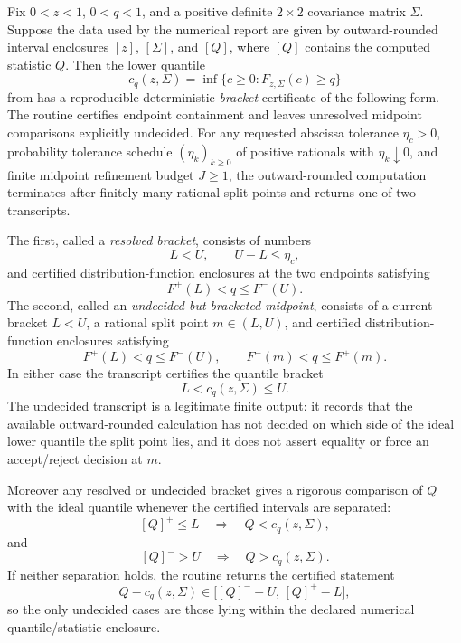 \begin{algorithmiclemma}\label{lem:certified-deterministic-projected-gaussian-quantile-main}
Fix \(0<z<1\), \(0<q<1\), and a positive definite \(2\times2\) covariance
matrix \(\Sigma\).  Suppose the data used by the numerical report are given by
outward-rounded interval enclosures \([z]\), \([\Sigma]\), and \([Q]\), where
\([Q]\) contains the computed statistic \(Q\).  Then the lower quantile
\[
c_q(z,\Sigma)=\inf\{c\ge0:F_{z,\Sigma}(c)\ge q\}
\]
from  has
a reproducible deterministic \emph{bracket} certificate of the following form.
The routine certifies endpoint containment and leaves unresolved midpoint
comparisons explicitly undecided.  For
any requested abscissa tolerance \(\eta_c>0\), probability tolerance
schedule \((\eta_k)_{k\ge0}\) of positive rationals with \(\eta_k\downarrow0\),
and finite midpoint refinement budget \(J\ge1\), the outward-rounded
computation terminates after finitely many rational split points and returns
one of two transcripts.

The first, called a \emph{resolved bracket}, consists of numbers
\[
L<U,\qquad U-L\le\eta_c,
\]
and certified distribution-function enclosures at the two endpoints satisfying
\[
F^+(L)<q\le F^-(U).
\]
The second, called an \emph{undecided but bracketed midpoint}, consists of a
current bracket \(L<U\), a rational split point \(m\in(L,U)\), and certified
distribution-function enclosures satisfying
\[
F^+(L)<q\le F^-(U),\qquad
F^-(m)<q\le F^+(m).
\]
In either case the transcript certifies the quantile bracket
\[
L<c_q(z,\Sigma)\le U.
\]
The undecided transcript is a legitimate finite output: it records that the
available outward-rounded calculation has not decided on which side of the
ideal lower quantile the split point lies, and it does not assert equality or
force an accept/reject decision at \(m\).

Moreover any resolved or undecided bracket gives a rigorous comparison of
\(Q\) with the ideal quantile whenever the certified intervals are separated:
\[
[Q]^+\le L\quad\Longrightarrow\quad Q<c_q(z,\Sigma),
\]
and
\[
[Q]^->U\quad\Longrightarrow\quad Q>c_q(z,\Sigma).
\]
If neither separation holds, the routine returns the certified statement
\[
Q-c_q(z,\Sigma)\in
\bigl[[Q]^--U,\,[Q]^+-L\bigr],
\]
so the only undecided cases are those lying within the declared numerical
quantile/statistic enclosure.


\end{algorithmiclemma}
